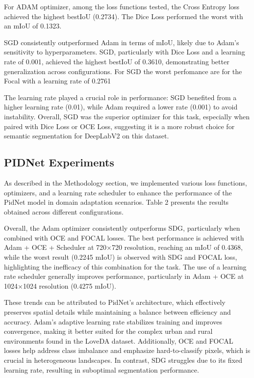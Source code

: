 \documentclass[10pt,twocolumn,letterpaper]{article}
\begin{document}
For ADAM optimizer, among the loss functions tested, the Cross Entropy loss achieved the highest bestIoU (0.2734). The Dice Loss performed the worst with an mIoU of 0.1323.

SGD consistently outperformed Adam in terms of mIoU, likely due to Adam’s sensitivity to hyperparameters. SGD, particularly with Dice Loss and a learning rate of 0.001, achieved the highest bestIoU of 0.3610, demonstrating better generalization across configurations. For SGD the worst perfomance are for the Focal with a learning rate of 0.2761

The learning rate played a crucial role in performance: SGD benefited from a higher learning rate (0.01), while Adam required a lower rate (0.001) to avoid instability. Overall, SGD was the superior optimizer for this task, especially when paired with Dice Loss or OCE Loss, suggesting it is a more robust choice for semantic segmentation for DeepLabV2 on this dataset.
 
\subsection{PIDNet Experiments}

As described in the Methodology section, we implemented various loss functions, optimizers, and a learning rate scheduler to enhance the performance of the PidNet model in domain adaptation scenarios. Table 2 presents the results obtained across different configurations.

Overall, the Adam optimizer consistently outperforms SDG, particularly when combined with OCE and FOCAL losses. The best performance is achieved with Adam + OCE + Scheduler at 720×720 resolution, reaching an mIoU of 0.4368, while the worst result (0.2245 mIoU) is observed with SDG and FOCAL loss, highlighting the inefficacy of this combination for the task. The use of a learning rate scheduler generally improves performance, particularly in Adam + OCE at 1024×1024 resolution (0.4275 mIoU).

These trends can be attributed to PidNet’s architecture, which effectively preserves spatial details while maintaining a balance between efficiency and accuracy. Adam’s adaptive learning rate stabilizes training and improves convergence, making it better suited for the complex urban and rural environments found in the LoveDA dataset. Additionally, OCE and FOCAL losses help address class imbalance and emphasize hard-to-classify pixels, which is crucial in heterogeneous landscapes. In contrast, SDG struggles due to its fixed learning rate, resulting in suboptimal segmentation performance.
\end{document}
